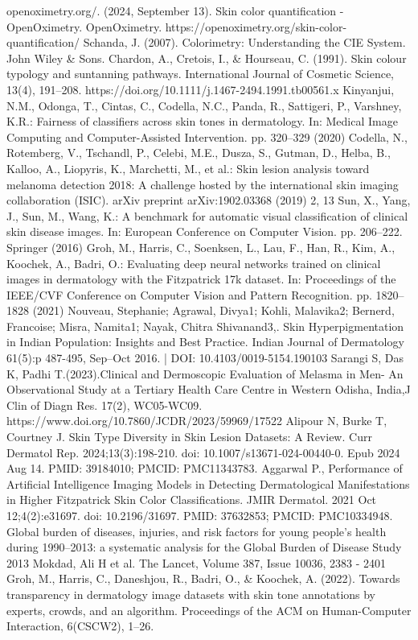 \begin{thebibliography}{}

openoximetry.org/. (2024, September 13). Skin color quantification - OpenOximetry. OpenOximetry. https://openoximetry.org/skin-color-quantification/
Schanda, J. (2007). Colorimetry: Understanding the CIE System. John Wiley \& Sons.
Chardon, A., Cretois, I., \& Hourseau, C. (1991). Skin colour typology and suntanning pathways. International Journal of Cosmetic Science, 13(4), 191–208. https://doi.org/10.1111/j.1467-2494.1991.tb00561.x
Kinyanjui, N.M., Odonga, T., Cintas, C., Codella, N.C., Panda, R., Sattigeri, P., Varshney, K.R.: Fairness of classifiers across skin tones in dermatology. In: Medical Image Computing and Computer-Assisted Intervention. pp. 320–329 (2020)
Codella, N., Rotemberg, V., Tschandl, P., Celebi, M.E., Dusza, S., Gutman, D., Helba, B., Kalloo, A., Liopyris, K., Marchetti, M., et al.: Skin lesion analysis toward melanoma detection 2018: A challenge hosted by the international skin imaging collaboration (ISIC). arXiv preprint arXiv:1902.03368 (2019) 2, 13
Sun, X., Yang, J., Sun, M., Wang, K.: A benchmark for automatic visual classification of clinical skin disease images. In: European Conference on Computer Vision. pp. 206–222. Springer (2016)
Groh, M., Harris, C., Soenksen, L., Lau, F., Han, R., Kim, A., Koochek, A., Badri, O.: Evaluating deep neural networks trained on clinical images in dermatology with the Fitzpatrick 17k dataset. In: Proceedings of the IEEE/CVF Conference on Computer Vision and Pattern Recognition. pp. 1820–1828 (2021) 
Nouveau, Stephanie; Agrawal, Divya1; Kohli, Malavika2; Bernerd, Francoise; Misra, Namita1; Nayak, Chitra Shivanand3,. Skin Hyperpigmentation in Indian Population: Insights and Best Practice. Indian Journal of Dermatology 61(5):p 487-495, Sep–Oct 2016. | DOI: 10.4103/0019-5154.190103
Sarangi S, Das K, Padhi T.(2023).Clinical and Dermoscopic Evaluation of Melasma in Men- An Observational Study at a Tertiary Health Care Centre in Western Odisha, India,J Clin of Diagn Res. 17(2), WC05-WC09. https://www.doi.org/10.7860/JCDR/2023/59969/17522
Alipour N, Burke T, Courtney J. Skin Type Diversity in Skin Lesion Datasets: A Review. Curr Dermatol Rep. 2024;13(3):198-210. doi: 10.1007/s13671-024-00440-0. Epub 2024 Aug 14. PMID: 39184010; PMCID: PMC11343783.
Aggarwal P., Performance of Artificial Intelligence Imaging Models in Detecting Dermatological Manifestations in Higher Fitzpatrick Skin Color Classifications. JMIR Dermatol. 2021 Oct 12;4(2):e31697. doi: 10.2196/31697. PMID: 37632853; PMCID: PMC10334948.
Global burden of diseases, injuries, and risk factors for young people's health during 1990–2013: a systematic analysis for the Global Burden of Disease Study 2013
Mokdad, Ali H et al.
The Lancet, Volume 387, Issue 10036, 2383 - 2401
Groh, M., Harris, C., Daneshjou, R., Badri, O., \& Koochek, A. (2022). Towards transparency in dermatology image datasets with skin tone annotations by experts, crowds, and an algorithm. Proceedings of the ACM on Human-Computer Interaction, 6(CSCW2), 1–26.



\end{thebibliography}
